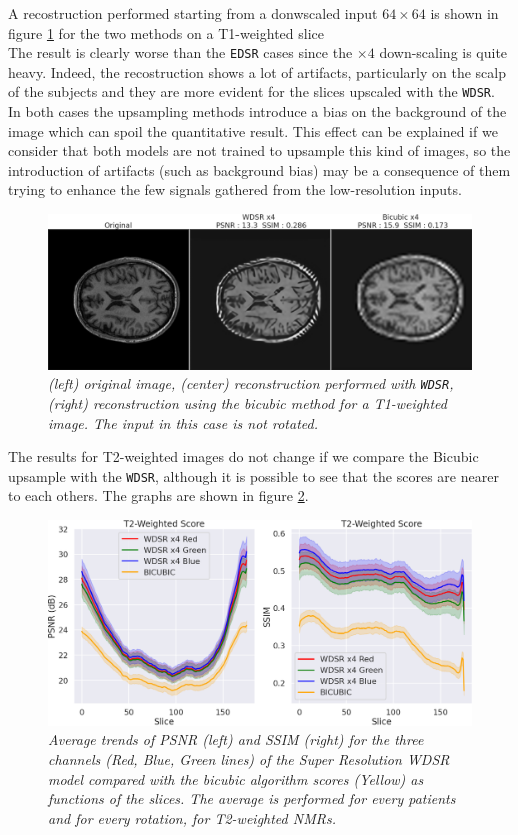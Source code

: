 \documentclass[12pt,a4paper]{report}
\begin{document}
A recostruction performed starting from a donwscaled input $64 \times 64$ is shown in figure \ref{wdsr-upscale} for the two methods on a T1-weighted slice
\\
The result is clearly worse than the {\tt EDSR} cases since the $ \times 4$ down-scaling is quite heavy. 
Indeed, the recostruction shows a lot of artifacts, particularly on the scalp of the subjects and they are more evident for the slices upscaled with the {\tt WDSR}.
In both cases the upsampling methods introduce a bias on the background of the image which can spoil the quantitative result.
This effect can be explained if we consider that both models are not trained to upsample this kind of images, so the introduction of artifacts (such as background bias) may be a consequence of them trying to enhance the few signals gathered from the low-resolution inputs.

\begin{figure}[H]
 \centering 
  \includegraphics[scale=0.3]{./images/wdsr-comp-images.png}
  \caption{\it (left) original image, (center) reconstruction performed with {\tt WDSR}, (right) reconstruction using the bicubic method for a T1-weighted image. The input in this case is not rotated.}
 \label{wdsr-upscale}
\end{figure}

The results for T2-weighted images do not change if we compare the Bicubic upsample with the {\tt WDSR}, although it is possible to see that the scores are nearer to each others. 
The graphs are shown in figure \ref{fig:wdsr-score-slide-t2}.

\begin{figure}[H]
  \centering
 \includegraphics[scale=0.37]{./images/WDSR_score_slide_t2_all.png}
  \caption{\it Average trends of PSNR (left) and SSIM (right) for the three channels (Red, Blue, Green lines) of the Super Resolution WDSR model compared with the bicubic algorithm scores (Yellow) as functions of the slices. The average is performed for every patients and for every rotation, for T2-weighted NMRs.}
 \label{fig:wdsr-score-slide-t2}
\end{figure}
\end{document}
